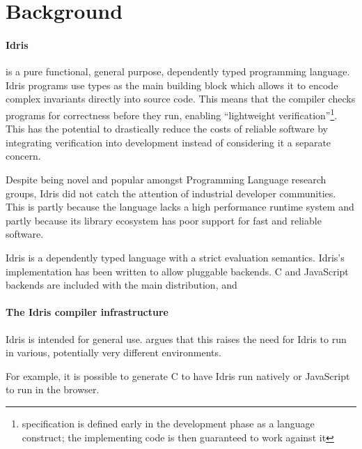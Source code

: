\documentclass[a4paper,11pt,twocolumn]{article}
\begin{document}
\section{Background}

\paragraph{Idris} %
is a pure functional,
general purpose, dependently typed programming language.
Idris programs use types as the main building block which allows it
to encode complex invariants directly into source code.
This means that the compiler checks programs for
correctness before they run, enabling
``lightweight verification''\footnote{specification is
	defined early in the development phase as a language construct;
	the implementing code is then guaranteed to work against it}.
This has the potential to drastically reduce the costs
of reliable software by integrating verification into development
instead of considering it a separate concern.

Despite being novel and popular amongst Programming Language research
groups, Idris did not catch the attention of industrial developer
communities.
This is partly because the language lacks a high performance
runtime system and partly because its library ecosystem has poor
support for fast and reliable software.

Idris \cite{idris} is a dependently typed language with a strict
evaluation semantics. Idris's implementation has been written to allow
pluggable backends. C and JavaScript backends are included with the
main distribution, and

\paragraph{The Idris compiler infrastructure}


Idris is intended for general use. \cite{crosscompilers} argues
that this raises the need for Idris to run in various, potentially
very different environments.

For example, it is possible to generate C to have Idris run
natively or JavaScript to run in the browser.
\end{document}
